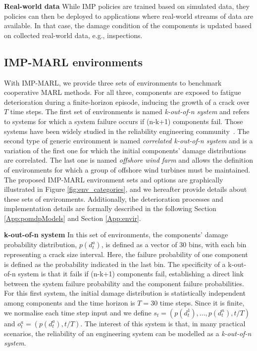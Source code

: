 \textbf{Real-world data} While IMP policies are trained based on simulated data, they policies can then be deployed to applications where real-world streams of data are available. In that case, the damage condition of the components is updated based on collected real-world data, e.g., inspections.
 
\subsection{IMP-MARL environments}
\label{time stepsec:implement_env}

With IMP-MARL, we provide three sets of environments to benchmark cooperative MARL methods.
For all three, components are exposed to fatigue deterioration during a finite-horizon episode, inducing the growth of a crack over $T$ time steps.
The first set of environments is named \textit{k-out-of-n system} and refers to systems for which a system failure occurs if (n-k+1) components fail.
Those systems have been widely studied in the reliability engineering community~\citep{barlow1984computing}. 
The second type of generic environment is named \textit{correlated k-out-of-n system} and is a variation of the first one for which the initial components' damage distributions are correlated.
The last one is named \textit{offshore wind farm} and allows the definition of environments for which a group of offshore wind turbines must be maintained.
The proposed IMP-MARL environment sets and options are graphically illustrated in Figure \ref{fig:env_categories}, and we hereafter provide details about these sets of environments.
Additionally, the deterioration processes and implementation details are formally described in the following Section \ref{App:pomdpModels} and Section \ref{App:envir}.

\textbf{k-out-of-n system}
In this set of environments, the components' damage probability distribution, $p(d^a_t)$, is defined as a vector of 30 bins, with each bin representing a crack size interval.
Here, the failure probability of one component is defined as the probability indicated in the last bin.
The specificity of a k-out-of-n system is that it fails if (n-k+1) components fail, establishing a direct link between the system failure probability and the component failure probabilities.
For this first system, the initial damage distribution is statistically independent among components and the time horizon is $T=30$ time steps.
Since it is finite, we normalise each time step input and we define $s_t = (p(d^1_t),..., p(d^n_t), t/T)$ and $o^a_t=(p(d^a_t), t/T)$.
The interest of this system is that, in many practical scenarios, the reliability of an engineering system can be modelled as a \textit{k-out-of-n system}.


